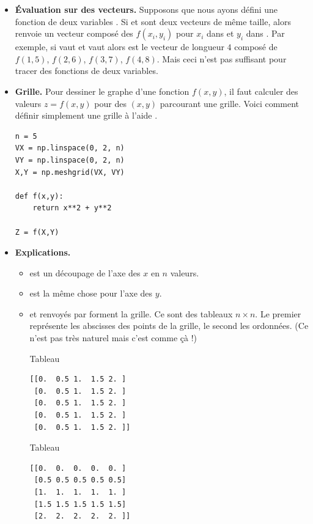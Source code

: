 \documentclass[11pt,class=report,crop=false]{standalone}
\begin{document}
\begin{itemize}
  \item \textbf{\'Evaluation sur des vecteurs.} 
Supposons que nous ayons défini une fonction \Python{} de deux variables .
Si  et  sont deux vecteurs de même taille, alors
 renvoie un vecteur composé des $f(x_i,y_i)$ pour $x_i$ dans  et $y_i$ dans .
Par exemple, si  vaut \ci{[1 2 3 4]} et  vaut \ci{[5 6 7 8]}
alors  est le vecteur de longueur $4$ composé de $f(1,5)$,
$f(2,6)$, $f(3,7)$, $f(4,8)$. Mais ceci n'est pas suffisant pour tracer des fonctions de deux variables. 
  \item \textbf{Grille.} 
Pour dessiner le graphe d'une fonction $f(x,y)$, il faut calculer des valeurs $z=f(x,y)$ pour des $(x,y)$ parcourant une grille. Voici comment définir simplement une grille à l'aide .

\begin{lstlisting}
n = 5
VX = np.linspace(0, 2, n)
VY = np.linspace(0, 2, n)
X,Y = np.meshgrid(VX, VY)

def f(x,y):
	return x**2 + y**2

Z = f(X,Y)
\end{lstlisting}

  \item \textbf{Explications.}
  \begin{itemize}
    \item {} est un découpage de l'axe des $x$ en $n$ valeurs.
    \item {} est la même chose pour l'axe des $y$.    
    \item {} et  renvoyés par  forment la grille. Ce sont des tableaux $n\times n$. Le premier représente les abscisses des points de la grille, le second les ordonnées. (Ce n'est pas très naturel mais c'est comme çà !)
     
    
\bigskip

\begin{center}
\begin{minipage}{0.45\textwidth}
Tableau 
\begin{center}
\begin{lstlisting}
[[0.  0.5 1.  1.5 2. ]
 [0.  0.5 1.  1.5 2. ]
 [0.  0.5 1.  1.5 2. ]
 [0.  0.5 1.  1.5 2. ]
 [0.  0.5 1.  1.5 2. ]]
\end{lstlisting}
\end{center}
\end{minipage}
\begin{minipage}{0.45\textwidth}
Tableau 
\begin{center}
\begin{lstlisting}
[[0.  0.  0.  0.  0. ]
 [0.5 0.5 0.5 0.5 0.5]
 [1.  1.  1.  1.  1. ]
 [1.5 1.5 1.5 1.5 1.5]
 [2.  2.  2.  2.  2. ]]   
\end{lstlisting}
\end{center}
\end{minipage} 
\end{center}


\end{itemize}
\end{itemize}
\end{document}
